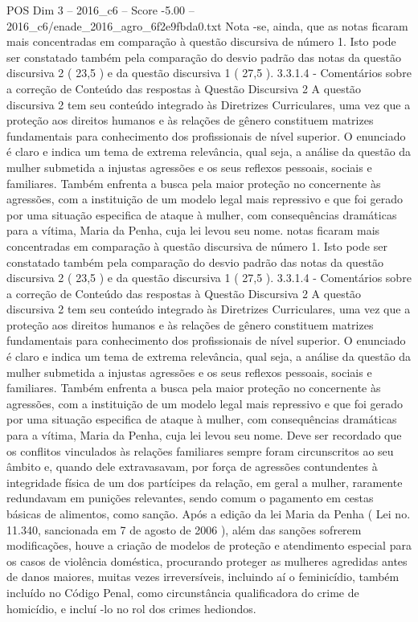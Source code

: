 \begin{textsample}{POS Dim 3 – 2016\_c6 – Score -5.00 – 2016\_c6/enade\_2016\_agro\_6f2e9fbda0.txt}
Nota -se, ainda, que as notas ficaram mais concentradas em comparação à questão discursiva de número 1.
Isto pode ser constatado também pela comparação do desvio padrão das notas da questão discursiva 2 ( 23,5 ) e da questão discursiva 1 ( 27,5 ). 3.3.1.4 - Comentários sobre a correção de Conteúdo das respostas à Questão Discursiva 2 A questão discursiva 2 tem seu conteúdo integrado às Diretrizes Curriculares, uma vez que a proteção aos direitos humanos e às relações de gênero constituem matrizes fundamentais para conhecimento dos profissionais de nível superior.
O enunciado é claro e indica um tema de extrema relevância, qual seja, a análise da questão da mulher submetida a injustas agressões e os seus reflexos pessoais, sociais e familiares.
Também enfrenta a busca pela maior proteção no concernente às agressões, com a instituição de um modelo legal mais repressivo e que foi gerado por uma situação especifica de ataque à mulher, com consequências dramáticas para a vítima, Maria da Penha, cuja lei levou seu nome. notas ficaram mais concentradas em comparação à questão discursiva de número 1.
Isto pode ser constatado também pela comparação do desvio padrão das notas da questão discursiva 2 ( 23,5 ) e da questão discursiva 1 ( 27,5 ). 3.3.1.4 - Comentários sobre a correção de Conteúdo das respostas à Questão Discursiva 2 A questão discursiva 2 tem seu conteúdo integrado às Diretrizes Curriculares, uma vez que a proteção aos direitos humanos e às relações de gênero constituem matrizes fundamentais para conhecimento dos profissionais de nível superior.
O enunciado é claro e indica um tema de extrema relevância, qual seja, a análise da questão da mulher submetida a injustas agressões e os seus reflexos pessoais, sociais e familiares.
Também enfrenta a busca pela maior proteção no concernente às agressões, com a instituição de um modelo legal mais repressivo e que foi gerado por uma situação especifica de ataque à mulher, com consequências dramáticas para a vítima, Maria da Penha, cuja lei levou seu nome.
Deve ser recordado que os conflitos vinculados às relações familiares sempre foram circunscritos ao seu âmbito e, quando dele extravasavam, por força de agressões contundentes à integridade física de um dos partícipes da relação, em geral a mulher, raramente redundavam em punições relevantes, sendo comum o pagamento em cestas básicas de alimentos, como sanção.
Após a edição da lei Maria da Penha ( Lei no. 11.340, sancionada em 7 de agosto de 2006 ), além das sanções sofrerem modificações, houve a criação de modelos de proteção e atendimento especial para os casos de violência doméstica, procurando proteger as mulheres agredidas antes de danos maiores, muitas vezes irreversíveis, incluindo aí o feminicídio, também incluído no Código Penal, como circunstância qualificadora do crime de homicídio, e incluí -lo no rol dos crimes hediondos.

\end{textsample}
